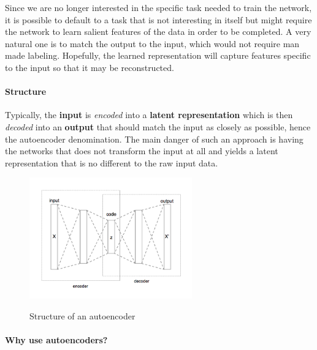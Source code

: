\documentclass[conference]{IEEEtran}
\begin{document}
Since we are no longer interested in the specific task needed to train the
network, it is possible to default to a task that is not interesting in itself
but might require the network to learn salient features of the data in order to
be completed. A very natural one is to match the output to the input, which
would not require man made labeling. Hopefully, the learned representation will
capture features specific to the input so that it may be reconstructed.

\paragraph{Structure}

Typically, the \textbf{input} is \textit{encoded} into a \textbf{latent
  representation} which is then \textit{decoded} into an \textbf{output} that
should match the input as closely as possible, hence the autoencoder
denomination. The main danger of such an approach is having the networks that
does not transform the input at all and yields a latent representation that is
no different to the raw input data. 


\begin{figure}[!h]
    \centering
    \caption{Structure of an autoencoder}
    \includegraphics[width=7cm]{Autoencoder_structure.png}
    \label{autoencoder_structure}
\end{figure}


\paragraph{Why use autoencoders?}
\end{document}
